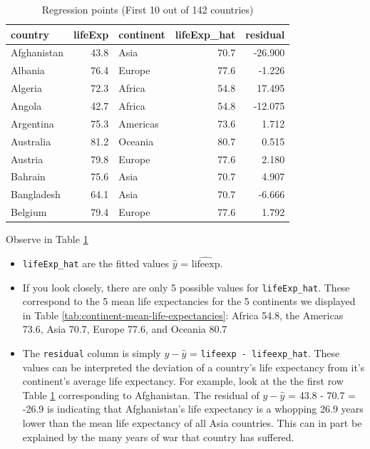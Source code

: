 \documentclass[12pt, krantz2,]{krantz}
\providecommand{\tightlist}{%
  \setlength{\itemsep}{0pt}\setlength{\parskip}{0pt}}
\begin{document}
\begin{table}[H]

\caption{\label{tab:model2-residuals}Regression points (First 10 out of 142 countries)}
\centering
\fontsize{10}{12}\selectfont
\begin{tabular}{lrlrr}
\toprule
country & lifeExp & continent & lifeExp\_hat & residual\\
\midrule
Afghanistan & 43.8 & Asia & 70.7 & -26.900\\
Albania & 76.4 & Europe & 77.6 & -1.226\\
Algeria & 72.3 & Africa & 54.8 & 17.495\\
Angola & 42.7 & Africa & 54.8 & -12.075\\
Argentina & 75.3 & Americas & 73.6 & 1.712\\
\addlinespace
Australia & 81.2 & Oceania & 80.7 & 0.515\\
Austria & 79.8 & Europe & 77.6 & 2.180\\
Bahrain & 75.6 & Asia & 70.7 & 4.907\\
Bangladesh & 64.1 & Asia & 70.7 & -6.666\\
Belgium & 79.4 & Europe & 77.6 & 1.792\\
\bottomrule
\end{tabular}
\end{table}

Observe in Table \ref{tab:model2-residuals}

\begin{itemize}
\tightlist
\item
  \texttt{lifeExp\_hat} are the fitted values \(\widehat{y}\) = \(\widehat{\text{lifeexp}}\).
\item
  If you look closely, there are only 5 possible values for \texttt{lifeExp\_hat}. These correspond to the 5 mean life expectancies for the 5 continents we displayed in Table \ref{tab:continent-mean-life-expectancies}: Africa 54.8, the Americas 73.6, Asia 70.7, Europe 77.6, and Oceania 80.7
\item
  The \texttt{residual} column is simply \(y - \widehat{y}\) = \texttt{lifeexp\ -\ lifeexp\_hat}. These values can be interpreted the deviation of a country's life expectancy from it's continent's average life expectancy. For example, look at the the first row Table \ref{tab:model2-residuals} corresponding to Afghanistan. The residual of \(y - \widehat{y}\) = 43.8 - 70.7 = -26.9 is indicating that Afghanistan's life expectancy is a whopping 26.9 years lower than the mean life expectancy of all Asia countries. This can in part be explained by the many years of war that country has suffered.
\end{itemize}
\end{document}

